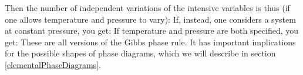 \documentclass[12pt]{article}
\begin{document}
Then the number of independent variations of the intensive variables is thus (if one allows temperature and pressure to vary): 
\eqs {}\eqe
If, instead, one considers a system at constant pressure, you get:
\eqs {}\eqe
If temperature and pressure are both specified, you get:
\eqs {}\eqe
These are all versions of the Gibbs phase rule. It has important implications for the possible shapes of phase diagrams, which we will describe in section \ref{elementalPhaseDiagrams}.




\end{document}
